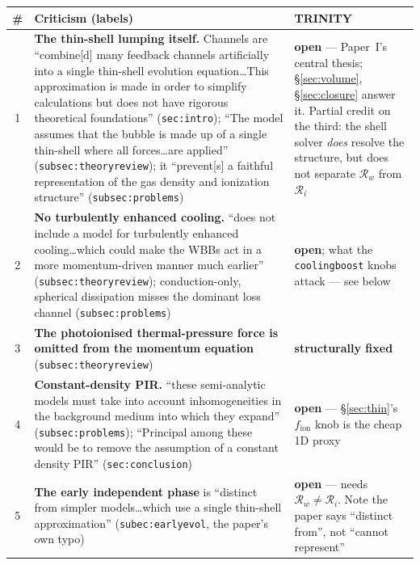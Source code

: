 \documentclass[11pt,a4paper,oneside]{report}
\newcommand{\brkus}{\textunderscore\allowbreak}
\newcommand{\code}[1]{\texttt{\small\let\_\brkus #1}}
\newcommand{\lbl}[1]{\texttt{\footnotesize\let\_\brkus #1}}
\newcommand{\PI}{Paper~I}
\newcommand{\Rw}{\mathcal{R}_{w}}
\newcommand{\Ri}{\mathcal{R}_{i}}
\newcommand{\up}[1]{\textcolor{tqaccent}{\textbf{#1}}}
\newcommand{\dn}[1]{\textcolor{tqblue}{\textbf{#1}}}
\begin{document}
\begin{table}[htbp]
\centering\footnotesize
\begin{tabular}{@{}c>{\raggedright\arraybackslash}p{}
                  >{\raggedright\arraybackslash}p{}@{}}
\toprule
\textbf{\sffamily \#} & \textbf{\sffamily Criticism (labels)} & \textbf{\sffamily TRINITY}\\
\midrule
1 & \textbf{The thin-shell lumping itself.} Channels are ``combine[d] many feedback channels
    artificially into a single thin-shell evolution equation\ldots This approximation is made in
    order to simplify calculations but does not have rigorous theoretical foundations''
    (\lbl{sec:intro}); ``The model assumes that the bubble is made up of a single thin-shell where
    all forces\ldots are applied'' (\lbl{subsec:theory\_review}); it ``prevent[s] a faithful
    representation of the gas density and ionization structure'' (\lbl{subsec:problems})
  & \dn{open} --- \PI's central thesis; \S\ref{sec:volume}, \S\ref{sec:closure} answer it. Partial
    credit on the third: the shell solver \emph{does} resolve the structure, but does not separate
    $\Rw$ from $\Ri$\\
2 & \textbf{No turbulently enhanced cooling.} ``does not include a model for turbulently enhanced
    cooling\ldots which could make the WBBs act in a more momentum-driven manner much earlier''
    (\lbl{subsec:theory\_review}); conduction-only, spherical dissipation misses the dominant loss
    channel (\lbl{subsec:problems})
  & \dn{open}; what the \code{cooling\_boost} knobs attack --- see below\\
3 & \textbf{The photoionised thermal-pressure force is omitted from the momentum equation}
    (\lbl{subsec:theory\_review}) & \up{structurally fixed}\\
4 & \textbf{Constant-density PIR.} ``these semi-analytic models must take into account
    inhomogeneities in the background medium into which they expand'' (\lbl{subsec:problems});
    ``Principal among these would be to remove the assumption of a constant density PIR''
    (\lbl{sec:conclusion}) & \dn{open} --- \S\ref{sec:thin}'s $f_{\mathrm{ion}}$ knob is the cheap
    1D proxy\\
5 & \textbf{The early independent phase} is ``distinct from simpler models\ldots which use a single
    thin-shell approximation'' (\lbl{subec:early\_evol}, the paper's own typo) & \dn{open} --- needs
    $\Rw\ne\Ri$. Note the paper says ``distinct from'', not ``cannot represent''\\

\end{tabular}
\end{table}
\end{document}
